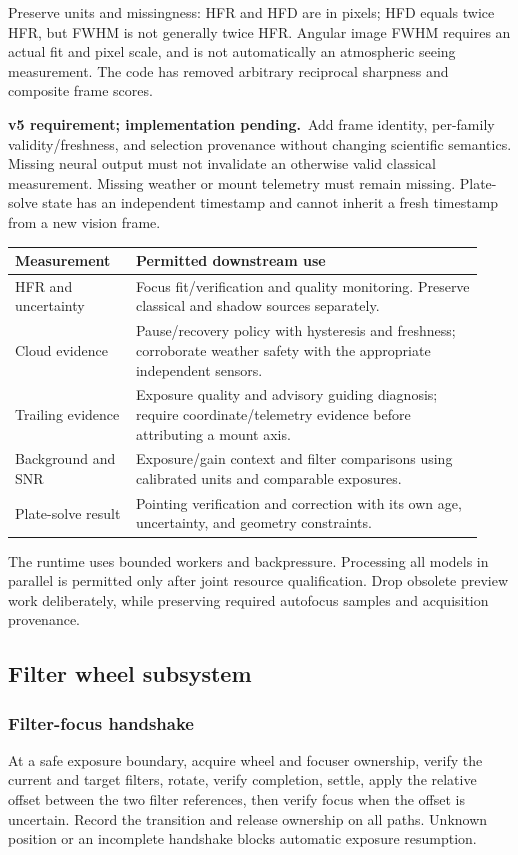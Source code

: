 \documentclass[11pt,a4paper]{article}
\newcommand{\planned}{\textbf{v5 requirement; implementation pending.}\ }
\begin{document}
Preserve units and missingness: HFR and HFD are in pixels; HFD equals twice HFR,
but FWHM is not generally twice HFR. Angular image FWHM requires an actual fit
and pixel scale, and is not automatically an atmospheric seeing measurement.
The code has removed arbitrary reciprocal sharpness and composite frame scores.

\planned Add frame identity, per-family validity/freshness, and selection
provenance without changing scientific semantics. Missing neural output must
not invalidate an otherwise valid classical measurement. Missing weather or
mount telemetry must remain missing. Plate-solve state has an independent
timestamp and cannot inherit a fresh timestamp from a new vision frame.

\begin{longtable}{@{}L{0.24\linewidth}L{0.69\linewidth}@{}}
\toprule Measurement & Permitted downstream use\\\midrule\endhead
HFR and uncertainty & Focus fit/verification and quality monitoring. Preserve
classical and shadow sources separately.\\
Cloud evidence & Pause/recovery policy with hysteresis and freshness; corroborate
weather safety with the appropriate independent sensors.\\
Trailing evidence & Exposure quality and advisory guiding diagnosis; require
coordinate/telemetry evidence before attributing a mount axis.\\
Background and SNR & Exposure/gain context and filter comparisons using
calibrated units and comparable exposures.\\
Plate-solve result & Pointing verification and correction with its own age,
uncertainty, and geometry constraints.\\
\bottomrule
\end{longtable}
The runtime uses bounded workers and backpressure. Processing all models in
parallel is permitted only after joint resource qualification. Drop obsolete
preview work deliberately, while preserving required autofocus samples and
acquisition provenance.

\subsection{Filter wheel subsystem}
\subsubsection{Filter-focus handshake}
At a safe exposure boundary, acquire wheel and focuser ownership, verify the
current and target filters, rotate, verify completion, settle, apply the
relative offset between the two filter references, then verify focus when
the offset is uncertain. Record the transition and release ownership on all
paths. Unknown position or an incomplete handshake blocks automatic exposure
resumption.
\end{document}
